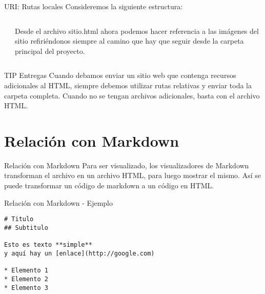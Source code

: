 
\begin{frame}{URI: Rutas locales}
	Consideremos la siguiente estructura:
	\begin{columns}
		\begin{column}{0.5\textwidth}
		\end{column}
		\begin{column}{0.5\textwidth}
			Desde el archivo sitio.html ahora podemos hacer referencia a las imágenes
			del sitio refiriéndonos siempre al camino que hay que seguir desde la
			carpeta principal del proyecto.
			\jump
			\jump
		\end{column}
	\end{columns}
\end{frame}


\begin{frame}[fragile]{TIP Entregas}
	Cuando debamos enviar un sitio web que contenga recursos adicionales al HTML,
	siempre debemos utilizar rutas relativas y enviar toda la carpeta completa.
	\jump
	Cuando no se tengan archivos adicionales, basta con el archivo HTML.
\end{frame}


\section{Relación con Markdown}


\begin{frame}[fragile]{Relación con Markdown}
	Para ser visualizado, los visualizadores de Markdown
	transforman el archivo en un archivo HTML, para luego
	mostrar el mismo.
	\jump
	Así se puede transformar un código de markdown a un código en HTML.
\end{frame}


\begin{frame}[fragile]{Relación con Markdown - Ejemplo}
	\begin{lstlisting}
# Titulo
## Subtitulo

Esto es texto **simple**
y aquí hay un [enlace](http://google.com)

* Elemento 1
* Elemento 2
* Elemento 3
		\end{lstlisting}
\end{frame}

